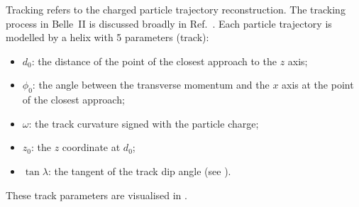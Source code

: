 Tracking refers to the charged particle trajectory reconstruction.
The tracking process in Belle~II is discussed broadly in Ref.~\cite{BelleIITrackingGroup:2020hpx}.
Each particle trajectory is modelled by a helix with 5 parameters (track):
\begin{itemize}
    \item $d_0$: the distance of the point of the closest approach to the $z$ axis;
    \item $\phi_0$: the angle between the transverse momentum and the $x$ axis at the point of the closest approach;
    \item $\omega$: the track curvature signed with the particle charge;
    \item $z_0$: the $z$ coordinate at $d_0$;
    \item $\tan\lambda$: the tangent of the track dip angle (see ).
\end{itemize}
These track parameters are visualised in .
